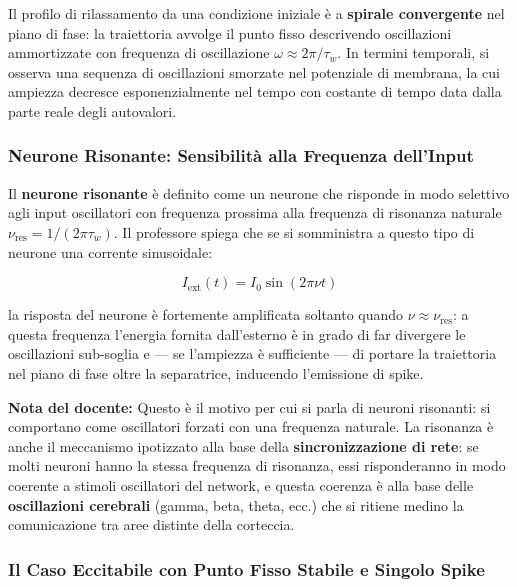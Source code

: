 Il profilo di rilassamento da una condizione iniziale è a \textbf{spirale convergente} nel piano di fase: la traiettoria avvolge il punto fisso descrivendo oscillazioni ammortizzate con frequenza di oscillazione $\omega \approx 2\pi / \tau_w$. In termini temporali, si osserva una sequenza di oscillazioni smorzate nel potenziale di membrana, la cui ampiezza decresce esponenzialmente nel tempo con costante di tempo data dalla parte reale degli autovalori.

\subsubsection{Neurone Risonante: Sensibilità alla Frequenza dell'Input}

Il \textbf{neurone risonante} è definito come un neurone che risponde in modo selettivo agli input oscillatori con frequenza prossima alla frequenza di risonanza naturale $\nu_{\text{res}} = 1/(2\pi\tau_w)$. Il professore spiega che se si somministra a questo tipo di neurone una corrente sinusoidale:

\begin{equation}
I_{\text{ext}}(t) = I_0 \sin(2\pi \nu t)
\end{equation}

la risposta del neurone è fortemente amplificata soltanto quando $\nu \approx \nu_{\text{res}}$: a questa frequenza l'energia fornita dall'esterno è in grado di far divergere le oscillazioni sub-soglia e — se l'ampiezza è sufficiente — di portare la traiettoria nel piano di fase oltre la separatrice, inducendo l'emissione di spike.

\begin{tcolorbox}[colback=gray!5, colframe=gray!40, arc=2mm, boxrule=0.5pt]
\textbf{Nota del docente:} Questo è il motivo per cui si parla di neuroni risonanti: si comportano come oscillatori forzati con una frequenza naturale. La risonanza è anche il meccanismo ipotizzato alla base della \textbf{sincronizzazione di rete}: se molti neuroni hanno la stessa frequenza di risonanza, essi risponderanno in modo coerente a stimoli oscillatori del network, e questa coerenza è alla base delle \textbf{oscillazioni cerebrali} (gamma, beta, theta, ecc.) che si ritiene medino la comunicazione tra aree distinte della corteccia.
\end{tcolorbox}

\subsubsection{Il Caso Eccitabile con Punto Fisso Stabile e Singolo Spike}

